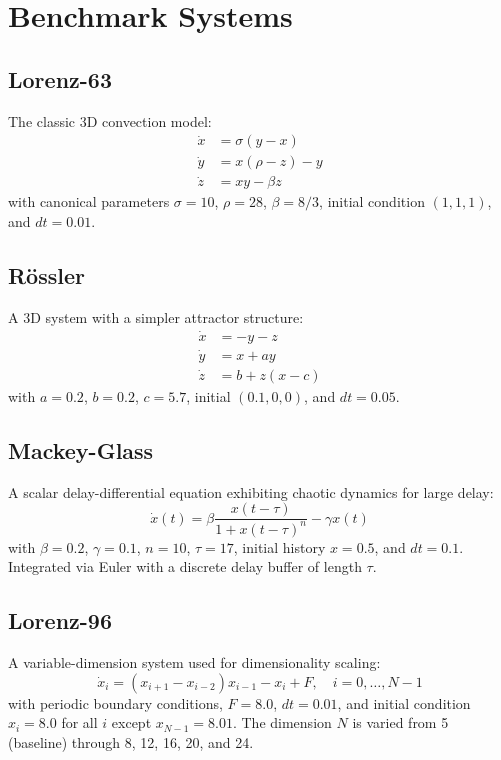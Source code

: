 \documentclass[11pt]{article}
\begin{document}
\section{Benchmark Systems}

\subsection{Lorenz-63}

The classic 3D convection model:
\begin{align}
    \dot{x} &= \sigma(y - x) \\
    \dot{y} &= x(\rho - z) - y \\
    \dot{z} &= xy - \beta z
\end{align}
with canonical parameters $\sigma=10$, $\rho=28$, $\beta=8/3$, initial condition $(1,1,1)$, and $dt=0.01$.

\subsection{R\"ossler}

A 3D system with a simpler attractor structure:
\begin{align}
    \dot{x} &= -y - z \\
    \dot{y} &= x + ay \\
    \dot{z} &= b + z(x - c)
\end{align}
with $a=0.2$, $b=0.2$, $c=5.7$, initial $(0.1, 0, 0)$, and $dt=0.05$.

\subsection{Mackey-Glass}

A scalar delay-differential equation exhibiting chaotic dynamics for large delay:
\begin{equation}
    \dot{x}(t) = \beta \frac{x(t-\tau)}{1 + x(t-\tau)^n} - \gamma x(t)
\end{equation}
with $\beta=0.2$, $\gamma=0.1$, $n=10$, $\tau=17$, initial history $x=0.5$, and $dt=0.1$. Integrated via Euler with a discrete delay buffer of length $\tau$.

\subsection{Lorenz-96}

A variable-dimension system used for dimensionality scaling:
\begin{equation}
    \dot{x}_i = (x_{i+1} - x_{i-2})x_{i-1} - x_i + F, \quad i = 0, \ldots, N-1
\end{equation}
with periodic boundary conditions, $F=8.0$, $dt=0.01$, and initial condition $x_i = 8.0$ for all $i$ except $x_{N-1} = 8.01$. The dimension $N$ is varied from 5 (baseline) through 8, 12, 16, 20, and 24.
\end{document}
